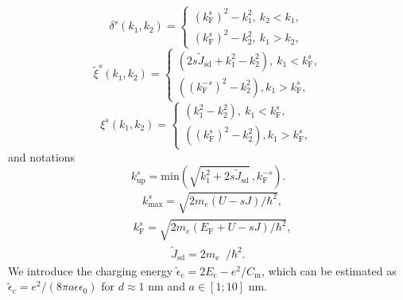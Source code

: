 \documentclass[aps,prb,amsmath,amssymb,twocolumn,superscriptaddress,showpacs,floatfix]{revtex4-1}
\DeclareMathOperator{\Ji}{\mathit J_{\mathrm{sd}}}
\begin{document}
\begin{equation}\label{Eq:AuxFunc2}
\delta^s(k_1,k_2)=\left\{\begin{array}{l} (k^s_\mathrm F)^2-k^2_1,~k_2<k_1,\\
(k^s_\mathrm F)^2-k^2_2,~k_1>k_2,~\end{array}\right.
\end{equation}
\begin{equation}\label{Eq:AuxFunc1}
\tilde\xi^s(k_1,k_2)=\left\{\begin{array}{l}(2s\tilde J_\mathrm{sd}+k_1^2-k_2^2),~k_1<k_\mathrm F^s,\\
((k_\mathrm F^{-s})^2-k_2^2),k_1>k_\mathrm F^s,~\end{array}\right.
\end{equation}
\begin{equation}\label{Eq:AuxFunc}
\xi^s(k_1,k_2)=\left\{\begin{array}{l}(k_1^2-k_2^2),~k_1<k_\mathrm F^s,\\
((k_\mathrm F^s)^2-k_2^2),k_1>k_\mathrm F^s,~\end{array}\right.
\end{equation}
and notations
\begin{equation}\label{Eq:AuxFunc4}
k^s_\mathrm{up}=\mathrm{min}(\sqrt{k^2_1+2s\tilde J_\mathrm{sd}} \, ,k_\mathrm F^{-s}).
\end{equation}
\begin{equation}\label{Eq:AuxNot1}
\begin{split}
&k^s_\mathrm{max}=\sqrt{2m_e(U-sJ)/\hbar^2},
\end{split}
\end{equation}
\begin{equation}\label{Eq:AuxNot2}
\begin{split}
&k^s_\mathrm{F}=\sqrt{2m_e(E_\mathrm F+U-sJ)/\hbar^2},
\end{split}
\end{equation}
\begin{equation}\label{Eq:AuxNot3}
\begin{split}
\tilde J_\mathrm{sd}=2m_\mathrm e\Ji/\hbar^2.
\end{split}
\end{equation}
We introduce the charging energy
$\tilde \epsilon_\mathrm c=2E_\mathrm c-e^2/C_\mathrm m$, which can be estimated as
$\tilde \epsilon_\mathrm c=e^2/(8\pi a\epsilon\epsilon_0)$ for $d\approx1$ nm and $a\in\left[1;10\right]$ nm.
\end{document}
